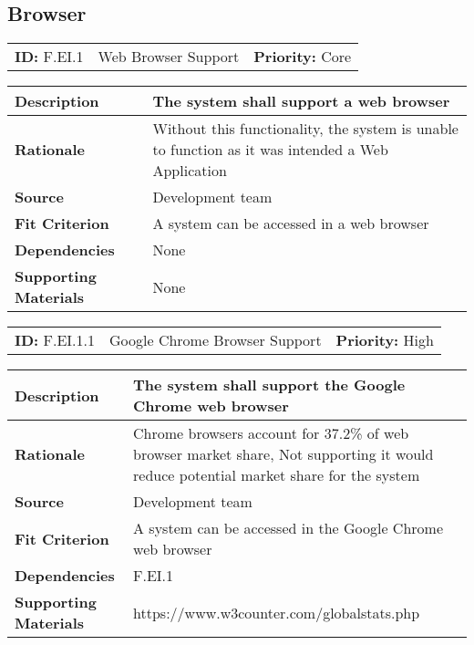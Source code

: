 \subsection{Browser}
\begin{table}[H]
    \begin{tabularx}{\textwidth}{| l | X | l |}
        \hline
        \textbf{ID:} F.EI.1 & Web Browser Support & \textbf{Priority:} Core \\
    \end{tabularx}
    \begin{tabularx}{\textwidth}{| l | X |}
        \hline
        \textbf{Description} & The system shall support a web browser \\ \hline
        \textbf{Rationale} & Without this functionality, the system is unable to function as it was intended a Web Application \\ \hline
        \textbf{Source} &  Development team\\ \hline
        \textbf{Fit Criterion} & A system can be accessed in a web browser  \\ \hline
        \textbf{Dependencies} & None \\ \hline
        \textbf{Supporting Materials} & None \\ \hline
    \end{tabularx}
\end{table}

\begin{table}[H]
    \begin{tabularx}{\textwidth}{| l | X | l |}
        \hline
        \textbf{ID:} F.EI.1.1 & Google Chrome Browser Support & \textbf{Priority:} High \\
    \end{tabularx}
    \begin{tabularx}{\textwidth}{| l | X |}
        \hline
        \textbf{Description} & The system shall support the Google Chrome web browser \\ \hline
        \textbf{Rationale} & Chrome browsers account for 37.2\% of web browser market share, Not supporting it would reduce potential market share for the system\\ \hline
        \textbf{Source} &  Development team\\ \hline
        \textbf{Fit Criterion} & A system can be accessed in the Google Chrome web browser  \\ \hline
        \textbf{Dependencies} & F.EI.1 \\ \hline
        \textbf{Supporting Materials} & https://www.w3counter.com/globalstats.php \\ \hline
    \end{tabularx}
\end{table}

